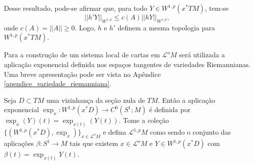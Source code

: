 \documentclass[12pt]{book}
\newcommand{\caminhosexponenciaisSobolev}{\mathcal{L}^{1,p}M}
\newcommand{\circulo}{S^{1}}
\newcommand{\espacosobolev}[1]{W^{1,p}(#1)}
\newcommand{\norma}[1]{||#1||}
\newcommand{\normaWp}[1]{||#1||_{W^{1,p}}}
\newcommand{\pullbackfibradotangente}[2]{#1^{*}T#2}
\newcommand{\pullbackfibradotangenteM}[1]{\pullbackfibradotangente{#1}{M}}
\newcommand{\lacocontrateis}{\mathcal{L}^{o}M}
\begin{document}
	Desse resultado, pode-se afirmar que, para todo $Y \in \espacosobolev{\pullbackfibradotangente{x}{M}}$, tem-se
	$$
	\normaWp{h'Y} \leq c(A)\normaWp{hY},
	$$
	onde $c(A) = \norma{A}\geq 0$.
	Logo, $h$ e $h'$ definem a mesma topologia para $\espacosobolev{\pullbackfibradotangenteM{x}}$.
	
	Para a construção de um sistema local de cartas em $\lacocontrateis$ será utilizada a aplicação exponencial definida nos espaços tangentes de variedades Riemannianas. Uma breve apresentação pode ser vista no Apêndice \ref{apendice_variedade_riemanniana}.
	
	Seja $D \subset TM$ uma vizinhança da seção nula de $TM$. Então a aplicação exponencial $\exp_{x}: \espacosobolev{x^{*}D} \to C^{0}(\circulo;M)$ é definida por $\exp_{x}(Y)(t) = \exp_{x(t)}(Y(t))$.
	Tome a coleção $\{ (\espacosobolev{x^{*}D}, \exp_{x}) \}_{x \in \lacocontrateis}$ e defina $\caminhosexponenciaisSobolev$ como sendo o conjunto das aplicações $\beta:\circulo\to M$ tais que existem $x\in \lacocontrateis$ e $Y \in \espacosobolev{x^{*}D}$ com $\beta(t)=\exp_{x(t)}Y(t)$.
	
\end{document}
